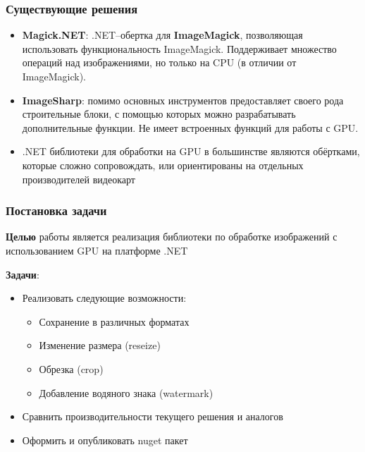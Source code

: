 \documentclass[aspectratio=169]{beamer}
\begin{document}
\begin{frame}  
  \frametitle{Существующие решения}
    \begin{itemize}
    
        \item \textbf{Magick.NET}: .NET--обертка для \textbf{ImageMagick}, позволяющая использовать функциональность ImageMagick. Поддерживает множество операций над изображениями, но только на CPU (в отличии от ImageMagick).
    
        \item \textbf{ImageSharp}: помимо основных инструментов предоставляет своего рода строительные блоки, с помощью которых можно разрабатывать дополнительные функции. Не имеет встроенных функций для работы с GPU.

        \item .NET библиотеки для обработки на GPU в большинстве являются обёртками, которые сложно сопровождать, или ориентированы на отдельных производителей видеокарт
    \end{itemize}
    
\end{frame}

\begin{frame}
  \frametitle{Постановка задачи}
  \textbf{Целью} работы является реализация библиотеки по обработке изображений с использованием GPU на платформе .NET %
  
  \textbf{Задачи}:
  \begin{itemize}
    \item Реализовать следующие возможности:
    \begin{itemize}
        \item Сохранение в различных форматах
        \item Изменение размера (reseize)
        \item Обрезка (crop)
        \item Добавление водяного знака (watermark)
    \end{itemize}
    \item Сравнить производительности текущего решения и аналогов 
    \item Оформить и опубликовать nuget пакет
  \end{itemize}
\end{frame}
\end{document}
